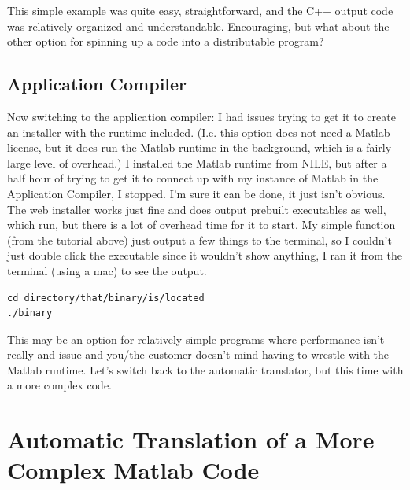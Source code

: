 \documentclass{article}
\begin{document}

This simple example was quite easy, straightforward, and the C++ output code was relatively organized and understandable.  Encouraging, but what about the other option for spinning up a code into a distributable program?

\subsection{Application Compiler}
Now switching to the application compiler: I had issues trying to get it to create an installer with the runtime included. (I.e. this option does not need a Matlab license, but it does run the Matlab runtime in the background, which is a fairly large level of overhead.) I installed the Matlab runtime from NILE, but after a half hour of trying to get it to connect up with my instance of Matlab in the Application Compiler, I stopped. I'm sure it can be done, it just isn't obvious. The web installer works just fine and does output prebuilt executables as well, which run, but there is a lot of overhead time for it to start. My simple function (from the tutorial above) just output a few things to the terminal, so I couldn't just double click the executable since it wouldn't show anything, I ran it from the terminal (using a mac) to see the output.

\begin{verbatim}
cd directory/that/binary/is/located
./binary
\end{verbatim}

This may be an option for relatively simple programs where performance isn't really and issue and you/the customer doesn't mind having to wrestle with the Matlab runtime.  Let's switch back to the automatic translator, but this time with a more complex code.

\section{Automatic Translation of a More Complex Matlab Code}
\end{document}
